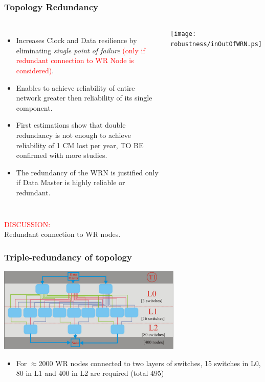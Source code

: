 \documentclass[]{beamer}
\begin{document}
\begin{frame}
  \frametitle{Topology Redundancy}   

  \begin{columns}[c]
  \column{3.8in} 

  \begin{itemize}
  \item Increases Clock and Data resilience by eliminating \textit{single point
	of failure} \textcolor{red}{(only if redundant connection to WR Node is
	considered)}.
  \item Enables to achieve reliability of entire network greater then
	reliability of its single component.
  \item First estimations show that double redundancy is not enough to achieve
	reliability of 1 CM lost per year, TO BE confirmed with more studies.
  \item The redundancy of the WRN is justified only if Data Master is
	highly reliable or redundant.
  \end{itemize}

  \column{1.2in}
  \centering
  \texttt{[image: robustness/inOutOfWRN.ps]}

  \end{columns}
\centering
\textcolor{red}{DISCUSSION:} \\
Redundant connection to WR nodes.

\end{frame}

\begin{frame}
  \frametitle{Triple-redundancy of topology}
  \centering
  \includegraphics[height=4cm,keepaspectratio]{robustness/tripleTopology}

  \begin{itemize}
  \item For $\approx$2000 WR nodes connected to two layers of switches,
        15 switches in L0, 80 in L1 and 400 in L2 are required (total 495)
  \end{itemize}

\end{frame}
\end{document}
